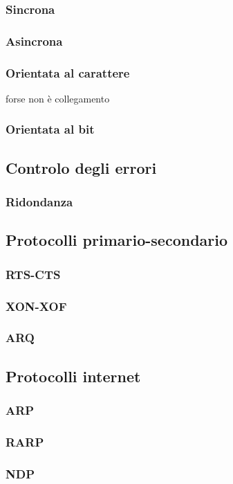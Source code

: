 \documentclass[a4paper,11pt]{paper}
\begin{document}
\subsubsection{Sincrona}
\subsubsection{Asincrona}
\subsubsection{Orientata al carattere} forse non è collegamento
\subsubsection{Orientata al bit}

\subsection{Controlo degli errori}
\subsubsection{Ridondanza}

\subsection{Protocolli primario-secondario}
\subsubsection{RTS-CTS}
\subsubsection{XON-XOF}
\subsubsection{ARQ}

\subsection{Protocolli internet}
\subsubsection{ARP}
\subsubsection{RARP}
\subsubsection{NDP}
\end{document}
